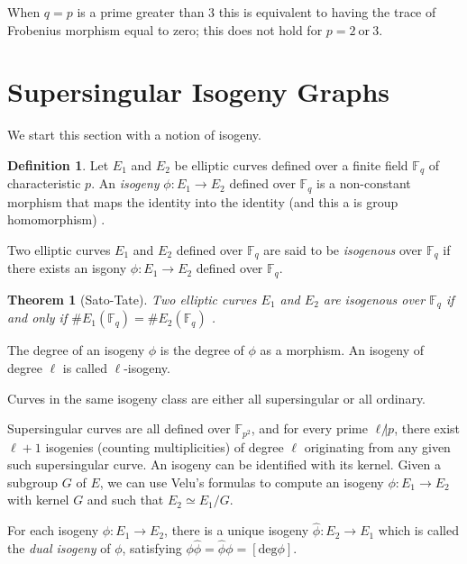 \documentclass{article}
\theoremstyle{theorem}
\newtheorem{theorem}{Theorem}
\theoremstyle{definition}
\newtheorem{definition}{Definition}
\begin{document}
When $q=p$ is a prime greater than 3 this is equivalent to having the trace of Frobenius morphism equal to zero; this does not hold for $p = 2 \ \text{or} \ 3$.


\section{Supersingular Isogeny Graphs}

We start this section with a notion of isogeny.
	\begin{definition} \label{isogeny}
		Let $E_1$ and $E_2$ be elliptic curves defined over a finite field $\mathbb{F}_q$ of characteristic $p$. An \textit{isogeny} $\phi: E_1 \to E_2$ defined over $\mathbb{F}_q$ is a non-constant morphism that maps the identity into the identity (and this a is group homomorphism) \cite[2.1]{HardEasyProbs}.
	\end{definition}
Two elliptic curves $E_1$ and $E_2$ defined over $\mathbb{F}_q$ are said to be \textit{isogenous} over $\mathbb{F}_q$ if there exists an isgony $\phi: E_1 \to E_2$ defined over $\mathbb{F}_q$.

\begin{theorem}[Sato-Tate]
	Two elliptic curves $E_1$ and $E_2$ are isogenous over $\mathbb{F}_q$ if and only if $\#E_1(\mathbb{F}_q) = \#E_2(\mathbb{F}_q)$ \cite[Theorem 13]{IsogenyCryptoDeFeo}. 
\end{theorem}  

The degree of an isogeny $\phi$ is the degree of $\phi$ as a morphism. An isogeny of degree $\ell$ is called $\ell$-isogeny. 

Curves in the same isogeny class are either all supersingular or all ordinary.


Supersingular curves are all defined over $\mathbb{F}_{p^2}$, and for every prime $\ell \not| p$, there exist $\ell + 1$ isogenies (counting multiplicities) of degree $\ell$ originating from any given such supersingular curve. An isogeny can be identified with its kernel. Given a subgroup $G$ of $E$, we can use Velu's formulas \cite[Proposition 39]{IsogenyCryptoDeFeo} to compute an isogeny $\phi: E_1 \to E_2$ with kernel $G$ and such that $E_2 \simeq E_1/G$. 

For each isogeny $\phi: E_1 \to E_2$, there is a unique isogeny $\hat{\phi}: E_2 \to E_1$ which is called the \textit{dual isogeny} of $\phi$, satisfying $\phi\hat{\phi} = \hat{\phi}\phi = [\mathrm{deg}\phi]$. 
\end{document}
